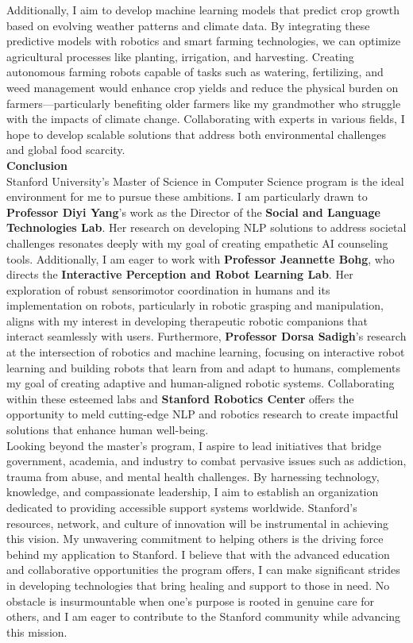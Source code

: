 \documentclass{article}
\begin{document}
Additionally, I aim to develop machine learning models that predict crop growth based on evolving weather patterns and climate data. By integrating these predictive models with robotics and smart farming technologies, we can optimize agricultural processes like planting, irrigation, and harvesting. Creating autonomous farming robots capable of tasks such as watering, fertilizing, and weed management would enhance crop yields and reduce the physical burden on farmers—particularly benefiting older farmers like my grandmother who struggle with the impacts of climate change. Collaborating with experts in various fields, I hope to develop scalable solutions that address both environmental challenges and global food scarcity.
\\

\textbf{Conclusion} \\
Stanford University's Master of Science in Computer Science program is the ideal environment for me to pursue these ambitions. I am particularly drawn to \textbf{Professor Diyi Yang}'s work as the Director of the \textbf{Social and Language Technologies Lab}. Her research on developing NLP solutions to address societal challenges resonates deeply with my goal of creating empathetic AI counseling tools. Additionally, I am eager to work with \textbf{Professor Jeannette Bohg}, who directs the \textbf{Interactive Perception and Robot Learning Lab}. Her exploration of robust sensorimotor coordination in humans and its implementation on robots, particularly in robotic grasping and manipulation, aligns with my interest in developing therapeutic robotic companions that interact seamlessly with users. Furthermore, \textbf{Professor Dorsa Sadigh}'s research at the intersection of robotics and machine learning, focusing on interactive robot learning and building robots that learn from and adapt to humans, complements my goal of creating adaptive and human-aligned robotic systems. Collaborating within these esteemed labs and \textbf{Stanford Robotics Center} offers the opportunity to meld cutting-edge NLP and robotics research to create impactful solutions that enhance human well-being.
\\

Looking beyond the master's program, I aspire to lead initiatives that bridge government, academia, and industry to combat pervasive issues such as addiction, trauma from abuse, and mental health challenges. By harnessing technology, knowledge, and compassionate leadership, I aim to establish an organization dedicated to providing accessible support systems worldwide. Stanford's resources, network, and culture of innovation will be instrumental in achieving this vision. My unwavering commitment to helping others is the driving force behind my application to Stanford. I believe that with the advanced education and collaborative opportunities the program offers, I can make significant strides in developing technologies that bring healing and support to those in need. No obstacle is insurmountable when one's purpose is rooted in genuine care for others, and I am eager to contribute to the Stanford community while advancing this mission.
\end{document}
